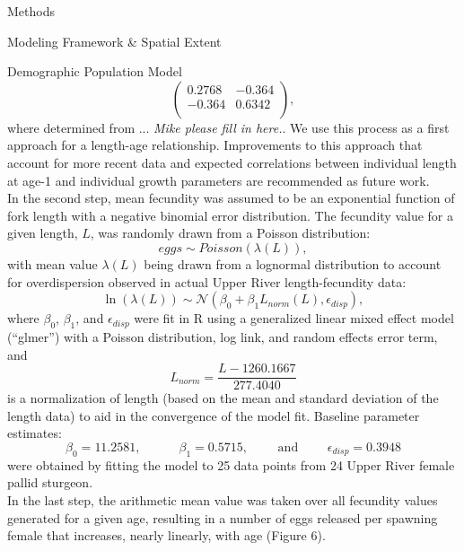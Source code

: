 \documentclass[12pt]{article}
\begin{document}
\begin{section}{Methods}
\begin{subsection}{Modeling Framework \& Spatial Extent}
\begin{subsubsection}{Demographic Population Model}
\begin{equation}
\begin{pmatrix}
0.2768 & -0.364\\
-0.364 & 0.6342\\
\end{pmatrix},
\end{equation}
 where determined from ... \textit{Mike please fill in here.}.  We use this process as a first approach for a length-age relationship.  Improvements to this approach that account for more recent data and expected correlations between individual length at age-1 and individual growth parameters are recommended as future work.\\ 

In the second step, mean fecundity was assumed to be an exponential function of fork length with a negative binomial error distribution.  The fecundity value for a given length, $L$, was randomly drawn from a Poisson distribution:
\begin{equation}
eggs \sim Poisson(\lambda(L)),
\end{equation}
with mean value $\lambda(L)$ being drawn from a lognormal distribution to account for overdispersion observed in actual Upper River length-fecundity data:
\begin{equation}
\ln(\lambda(L)) \sim \mathcal{N}(\beta_0 + \beta_1 L_{norm}(L), \epsilon_{disp}),
\end{equation}
where $\beta_0$, $\beta_1$, and $\epsilon_{disp}$ were fit in R using a generalized linear mixed effect model (``glmer'') with a Poisson distribution, log link, and random effects error term, and
\begin{equation}
L_{norm}=\frac{L-1260.1667}{277.4040}
\end{equation}
is a normalization of length (based on the mean and standard deviation of the length data) to aid in the convergence of the model fit.  Baseline parameter estimates:
\begin{equation}
\beta_0=11.2581,   \hspace{36pt} \beta_1=0.5715, \hspace{24pt} \mbox{ and } \hspace{24pt} \epsilon_{disp}=0.3948
\end{equation}
were obtained by fitting the model to 25 data points from 24 Upper River female pallid sturgeon. \\ 

In the last step, the arithmetic mean value was taken over all fecundity values generated for a given age, resulting in a number of eggs released per spawning female that increases, nearly linearly, with age (Figure 6).



\end{subsubsection}
\end{subsection}
\end{section}
\end{document}
